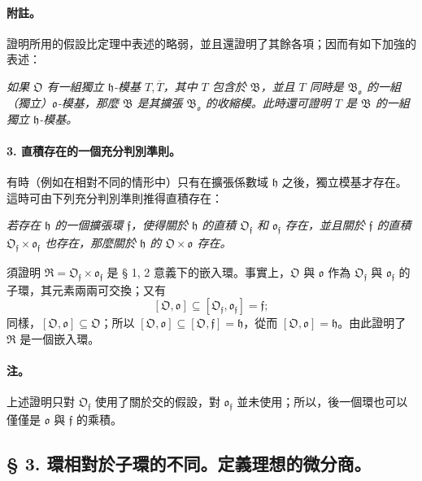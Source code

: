 \documentclass[11pt]{article}
\begin{document}
\paragraph{附註。}
證明所用的假設比定理中表述的略弱，並且還證明了其餘各項；因而有如下加強的表述：

\emph{如果 \(\mathfrak O\) 有一組獨立 \(\mathfrak h\)-模基 \(T,\overline T\)，其中 \(T\) 包含於 \(\mathfrak B\)，並且 \(T\) 同時是 \(\mathfrak B_{\mathfrak o}\) 的一組（獨立）\(\mathfrak o\)-模基，那麼 \(\mathfrak B\) 是其擴張 \(\mathfrak B_{\mathfrak o}\) 的收縮模。此時還可證明 \(T\) 是 \(\mathfrak B\) 的一組獨立 \(\mathfrak h\)-模基。}

\paragraph{3. 直積存在的一個充分判別準則。}
有時（例如在相對不同的情形中）只有在擴張係數域 \(\mathfrak h\) 之後，獨立模基才存在。這時可由下列充分判別準則推得直積存在：

\emph{若存在 \(\mathfrak h\) 的一個擴張環 \(\mathfrak f\)，使得關於 \(\mathfrak h\) 的直積 \(\mathfrak O_{\mathfrak f}\) 和 \(\mathfrak o_{\mathfrak f}\) 存在，並且關於 \(\mathfrak f\) 的直積 \(\mathfrak O_{\mathfrak f}\times\mathfrak o_{\mathfrak f}\) 也存在，那麼關於 \(\mathfrak h\) 的 \(\mathfrak O\times\mathfrak o\) 存在。}

須證明 \(\mathfrak R=\mathfrak O_{\mathfrak f}\times\mathfrak o_{\mathfrak f}\) 是 § 1, 2 意義下的嵌入環。事實上，\(\mathfrak O\) 與 \(\mathfrak o\) 作為 \(\mathfrak O_{\mathfrak f}\) 與 \(\mathfrak o_{\mathfrak f}\) 的子環，其元素兩兩可交換；又有
\[
[\mathfrak O,\mathfrak o]\subseteq[\mathfrak O_{\mathfrak f},\mathfrak o_{\mathfrak f}]=\mathfrak f;
\]
同樣，\([\mathfrak O,\mathfrak o]\subseteq\mathfrak O\)；所以 \([\mathfrak O,\mathfrak o]\subseteq[\mathfrak O,\mathfrak f]=\mathfrak h\)，從而 \([\mathfrak O,\mathfrak o]=\mathfrak h\)。由此證明了 \(\mathfrak R\) 是一個嵌入環。

\paragraph{注。}
上述證明只對 \(\mathfrak O_{\mathfrak f}\) 使用了關於交的假設，對 \(\mathfrak o_{\mathfrak f}\) 並未使用；所以，後一個環也可以僅僅是 \(\mathfrak o\) 與 \(\mathfrak f\) 的乘積。
\subsection*{§ 3. 環相對於子環的不同。定義理想的微分商。}
\end{document}
